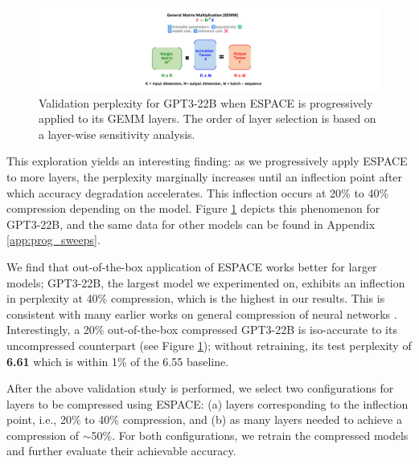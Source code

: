 \documentclass{article}
\theoremstyle{plain}
\begin{document}
\begin{figure}
\begin{center}
    \includegraphics[trim=26.5cm 0cm 31.5cm 1cm, clip, width=0.9\linewidth, page=8]{espace_paper_figures.pdf}
\end{center}
\caption{\footnotesize Validation perplexity for GPT3-22B when ESPACE is progressively applied to its GEMM layers. The order of layer selection is based on a layer-wise sensitivity analysis.}\vspace*{-0.5cm}
\label{fig:gpt3_22b}
\end{figure}

This exploration yields an interesting finding: as we progressively apply ESPACE to more layers, the perplexity marginally increases until an inflection point after which accuracy degradation accelerates. This inflection occurs at 20\% to 40\% compression depending on the model. Figure \ref{fig:gpt3_22b} depicts this phenomenon for GPT3-22B, and the same data for other models can be found in Appendix \ref{app:prog_sweeps}. 

We find that out-of-the-box application of ESPACE works better for larger models; GPT3-22B, the largest model we experimented on, exhibits an inflection in perplexity at 40\% compression, which is the highest in our results. This is consistent with many earlier works on general compression of neural networks \cite{park2020profit,nagel2022overcoming,kuzmin2024versus,dery2024everybody}. Interestingly, a 20\% out-of-the-box compressed GPT3-22B is iso-accurate to its uncompressed counterpart (see Figure \ref{fig:gpt3_22b}); without retraining, its test perplexity of \textbf{6.61} which is within 1\% of the 6.55 baseline.

After the above validation study is performed, we select two configurations for layers to be compressed using ESPACE: (a) layers corresponding to the inflection point, i.e., 20\% to 40\% compression, and (b) as many layers needed to achieve a compression of $\sim$50\%. For both configurations, we retrain the compressed models and further evaluate their achievable accuracy.
\end{document}
